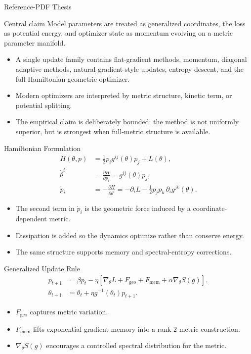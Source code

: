 ﻿\documentclass[aspectratio=169,11pt]{beamer}
\begin{document}
\begin{frame}{Reference-PDF Thesis}
  \begin{block}{Central claim}
    Model parameters are treated as generalized coordinates, the loss as potential energy,
    and optimizer state as momentum evolving on a metric parameter manifold.
  \end{block}
  \begin{itemize}
    \item A single update family contains flat-gradient methods, momentum, diagonal adaptive methods,
      natural-gradient-style updates, entropy descent, and the full Hamiltonian-geometric optimizer.
    \item Modern optimizers are interpreted by metric structure, kinetic term, or potential splitting.
    \item The empirical claim is deliberately bounded: the method is not uniformly superior, but is
      strongest when full-metric structure is available.
  \end{itemize}
\end{frame}

\begin{frame}{Hamiltonian Formulation}
  \small
  \begin{align*}
    H(\theta,p) &= \frac{1}{2}p_i g^{ij}(\theta)p_j + L(\theta),\\
    \dot{\theta}^{i} &= \frac{\partial H}{\partial p_i}
      = g^{ij}(\theta)p_j,\\
    \dot{p}_i &= -\frac{\partial H}{\partial \theta^i}
      = -\partial_i L
      - \frac{1}{2}p_j p_k\,\partial_i g^{jk}(\theta).
  \end{align*}
  \begin{itemize}
    \item The second term in $\dot p_i$ is the geometric force induced by a coordinate-dependent metric.
    \item Dissipation is added so the dynamics optimize rather than conserve energy.
    \item The same structure supports memory and spectral-entropy corrections.
  \end{itemize}
\end{frame}

\begin{frame}{Generalized Update Rule}
  \small
  \begin{align*}
    p_{t+1} &= \beta p_t - \eta\left[\nabla_\theta L
      + F_{\mathrm{geo}} + F_{\mathrm{mem}}
      + \alpha\nabla_\theta S(g)\right],\\
    \theta_{t+1} &= \theta_t + \eta g^{-1}(\theta_t)p_{t+1}.
  \end{align*}
  \begin{itemize}
    \item $F_{\mathrm{geo}}$ captures metric variation.
    \item $F_{\mathrm{mem}}$ lifts exponential gradient memory into a rank-2 metric construction.
    \item $\nabla_\theta S(g)$ encourages a controlled spectral distribution for the metric.
  \end{itemize}
\end{frame}
\end{document}
